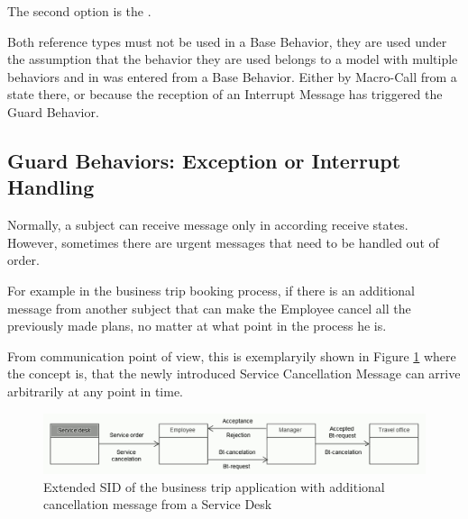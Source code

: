 The second option is the .

Both reference types must not be used in a Base Behavior, they are used under the assumption that the behavior they are used belongs to a model with multiple behaviors and in was entered from a Base Behavior. Either by Macro-Call from a state there, or because the reception of an Interrupt Message has triggered the Guard Behavior. 




\subsection{Guard Behaviors: Exception or Interrupt Handling} 

Normally, a subject can receive message only in according receive states. However, sometimes there are urgent messages that need to be handled out of order.

For example in the business trip booking process, if there is an additional message from another subject that can make the Employee cancel all the previously made plans, no matter at what point in the process he is.

From communication point of view, this is exemplaryily shown in Figure \ref{fig:sid-exception} where the concept is, that the newly introduced Service Cancellation Message can arrive arbitrarily at any point in time.

\begin{figure}[ph!]
	\centering
	\includegraphics[width=0.9\linewidth]{Figures/Ontology/SubjectBehavior/SID-Exception}
	\caption[Extended SID of the business trip application with additional cancellation message from a Service Desk]{Extended SID of the business trip application with additional cancellation message from a Service Desk}
	\label{fig:sid-exception}
\end{figure}

